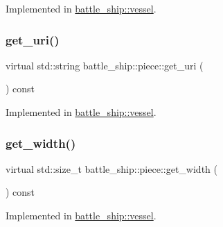 Implemented in \hyperlink{classbattle__ship_1_1vessel_aba133e1debe50caa9cbbae5e867b5995}{battle\+\_\+ship\+::vessel}.

\mbox{\label{classbattle__ship_1_1piece_aeba6c5083cb05200850cee7578a81d09}} 
\subsubsection{\texorpdfstring{get\+\_\+uri()}{get\_uri()}}
{\footnotesize\ttfamily virtual std\+::string battle\+\_\+ship\+::piece\+::get\+\_\+uri (\begin{DoxyParamCaption}{ }\end{DoxyParamCaption}) const\hspace{0.3cm}{\ttfamily [pure virtual]}}



Implemented in \hyperlink{classbattle__ship_1_1vessel_a3ab0850a3ccedf7e6083c7b494284289}{battle\+\_\+ship\+::vessel}.

\mbox{\label{classbattle__ship_1_1piece_a680897abc6ae9c5e187003a1c24fc9a1}} 
\subsubsection{\texorpdfstring{get\+\_\+width()}{get\_width()}}
{\footnotesize\ttfamily virtual std\+::size\+\_\+t battle\+\_\+ship\+::piece\+::get\+\_\+width (\begin{DoxyParamCaption}{ }\end{DoxyParamCaption}) const\hspace{0.3cm}{\ttfamily [pure virtual]}}



Implemented in \hyperlink{classbattle__ship_1_1vessel_a625d8f457a7afdafea7422ad89648123}{battle\+\_\+ship\+::vessel}.

\mbox{\label{classbattle__ship_1_1piece_ad589faff3ce07b5130bfdd89da4269c1}} 
